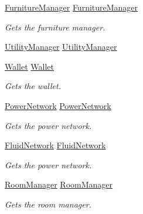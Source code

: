 \begin{DoxyCompactItemize}
\hyperlink{class_furniture_manager}{Furniture\+Manager} \hyperlink{class_world_afd8c3d504d1170f5c99b20162fc25a0e}{Furniture\+Manager}
\begin{DoxyCompactList}\small\item\em Gets the furniture manager. \end{DoxyCompactList}\item 
\hyperlink{class_utility_manager}{Utility\+Manager} \hyperlink{class_world_a093670f1e25572daa8cadd96ab295250}{Utility\+Manager}
\item 
\hyperlink{class_wallet}{Wallet} \hyperlink{class_world_a844a3f990503926d99a0a3410399f48f}{Wallet}
\begin{DoxyCompactList}\small\item\em Gets the wallet. \end{DoxyCompactList}\item 
\hyperlink{class_project_porcupine_1_1_power_network_1_1_power_network}{Power\+Network} \hyperlink{class_world_af1d11ccb7ad9d16b10bf364d7d54dc9d}{Power\+Network}
\begin{DoxyCompactList}\small\item\em Gets the power network. \end{DoxyCompactList}\item 
\hyperlink{class_project_porcupine_1_1_power_network_1_1_fluid_network}{Fluid\+Network} \hyperlink{class_world_a5594338bb722fdc0ae176764e741ccde}{Fluid\+Network}
\begin{DoxyCompactList}\small\item\em Gets the power network. \end{DoxyCompactList}\item 
\hyperlink{class_project_porcupine_1_1_rooms_1_1_room_manager}{Room\+Manager} \hyperlink{class_world_aa0c1e3f4fff3462c848030f89ef5ebf5}{Room\+Manager}
\begin{DoxyCompactList}\small\item\em Gets the room manager. \end{DoxyCompactList}\item 

\end{DoxyCompactItemize}
